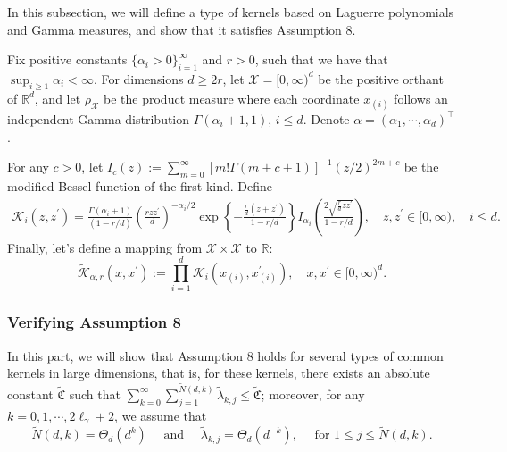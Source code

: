 \documentclass{article}
\theoremstyle{plain}
\theoremstyle{definition}
\theoremstyle{remark}
\begin{document}
\begin{appendix}
In this subsection, we will define a type of kernels based on Laguerre polynomials and Gamma measures, and show that it satisfies Assumption 8.

Fix positive constants $\{\alpha_i >0\}_{i=1}^{\infty}$ and $r > 0$, such that we have that $\sup_{i \geq 1} \alpha_i < \infty$.
For dimensions $d \geq 2r$, let $\mathcal{X} = [0, \infty)^d$ be the positive orthant of $\mathbb{R}^d$, and let $\rho_{\mathcal{X}}$ be the product measure where each coordinate $x_{(i)}$ follows an independent Gamma distribution $\Gamma(\alpha_i + 1, 1)$, $i \leq d$. 
Denote $\alpha = (\alpha_1, \cdots, \alpha_d)^{\top}$.


For any $c>0$, let $I_{c}(z):=\sum_{m=0}^{\infty} [m!\Gamma(m+c+1)]^{-1}(z/2)^{2m+c}$ be the modified Bessel function of the first kind. Define
\begin{equation*}
    \begin{aligned}
        \mathscr{K}_{i}(z, z^{\prime}) =
\frac{\Gamma(\alpha_i+1)}{\left(1- r /d\right)}
\left(\frac{r z z^{\prime}}{d}\right)^{-\alpha_i/2}
\exp\left\{-\frac{ \frac{r}{d}(z + z^{\prime})}{1- r / d}\right\}
I_{\alpha_i}\left(\frac{2\sqrt{ \frac{r}{d}z z^{\prime}}}{1- r /d}\right), \quad z, z^{\prime} \in [0, \infty), \quad i \leq d.
    \end{aligned}
\end{equation*}
Finally, let's define a mapping from $\mathcal{X} \times \mathcal{X}$ to $\mathbb{R}$:
\begin{equation}\label{eqn_def_product_Laguerre_kernels}
    \tilde{\mathscr{K}}_{\alpha, r}(x,x^\prime) := \prod_{i=1}^{d} \mathscr{K}_{i}(x_{(i)}, x_{(i)}^{\prime}), \quad x, x^{\prime} \in [0, \infty)^{d}.
\end{equation}


\subsubsection{Verifying Assumption 8}

In this part, we will show that Assumption 8 holds for several types of common kernels in large dimensions, that is, for these kernels, there exists an absolute constant $\tilde{\mathfrak{C}}$ such that $\sum_{k=0}^{\infty} \sum_{j=1}^{\tilde{N}(d, k)} \tilde{\lambda}_{k, j}\leq \tilde{\mathfrak{C}}$; moreover, for any $k  = 0, 1, \cdots, 2\ell_{\gamma} +2$, we assume that
\begin{equation}\label{eqn_appendix_eigen_gap_condition}
    \tilde{N}(d, k) = \Theta_d(d^{k}) \quad \text{ and } \quad 
        \tilde{\lambda}_{k, j} = \Theta_d(d^{-k}), \quad \text{ for } 1\leq j \leq \tilde{N}(d, k).
\end{equation}
    



\end{appendix}
\end{document}
